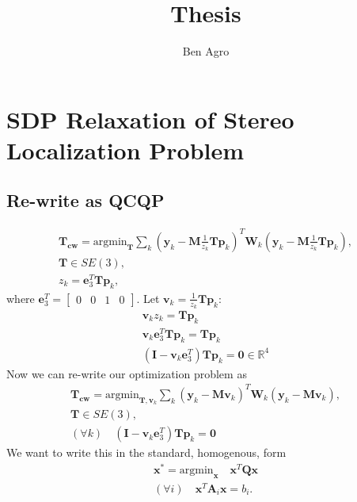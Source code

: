 \documentclass{article}
\title{Thesis}
\author{Ben Agro}
\date{}
\begin{document}
\maketitle

\section{SDP Relaxation of Stereo Localization Problem}

\subsection{Re-write as QCQP}

\begin{align}
\mathbf{T_{cw}} = \text{argmin}_{\mathbf{T}} \sum_k (\mathbf{y}_k - \mathbf{M} \frac{1}{z_k} \mathbf{T} \mathbf{p}_k)^T \mathbf{W}_k (\mathbf{y}_k - \mathbf{M} \frac{1}{z_k} \mathbf{T} \mathbf{p}_k),\\
\mathbf{T} \in SE(3),\\
z_k = \mathbf{e}_3^T \mathbf{T} \mathbf{p}_k,
\end{align}
where $\mathbf{e}_3^T = \begin{bmatrix}0 & 0 & 1 & 0\end{bmatrix}.$
Let $\mathbf{v}_k = \frac{1}{z_k}\mathbf{T}\mathbf{p}_k$:
\begin{align}
\mathbf{v}_kz_k = \mathbf{T}\mathbf{p}_k\\
\mathbf{v}_k \mathbf{e}_3^T \mathbf{T} \mathbf{p}_k = \mathbf{T}\mathbf{p}_k\\
(\mathbf{I} - \mathbf{v}_k \mathbf{e}_3^T)\mathbf{T}\mathbf{p}_k = \mathbf{0} \in \mathbb R^4
\end{align}
Now we can re-write our optimization problem as
\begin{align}
\mathbf{T_{cw}} = \text{argmin}_{\mathbf{T}, \mathbf{v}_k} \sum_k (\mathbf{y}_k - \mathbf{M} \mathbf{v}_k)^T \mathbf{W}_k (\mathbf{y}_k - \mathbf{M} \mathbf{v}_k),\\
\mathbf{T} \in SE(3),\\
(\forall k) \quad (\mathbf{I} - \mathbf{v}_k \mathbf{e}_3^T)\mathbf{T}\mathbf{p}_k = \mathbf{0}
\end{align}
We want to write this in the standard, homogenous, form 
\begin{align}
\mathbf{x}^* = \text{argmin}_{\mathbf{x}} \quad \mathbf{x}^T \mathbf{Q} \mathbf{x}\\
(\forall i) \quad \mathbf{x}^T \mathbf{A}_i \mathbf{x} = b_i.
\end{align}
\end{document}
